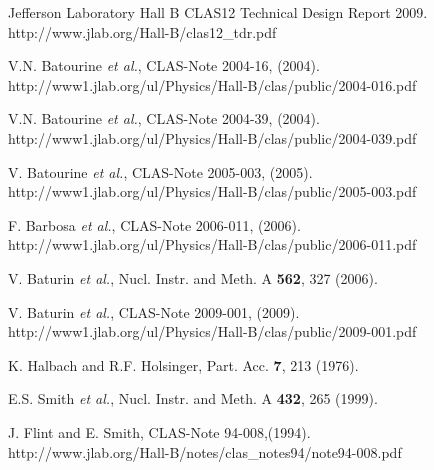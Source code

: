 \documentclass[12pt]{article}
\begin{document}
\begin{thebibliography}{99}

Jefferson Laboratory Hall B CLAS12 Technical Design Report 2009.\\
http://www.jlab.org/Hall-B/clas12\_tdr.pdf

V.N. Batourine {\it et al.}, %
CLAS-Note 2004-16, (2004).\\
http://www1.jlab.org/ul/Physics/Hall-B/clas/public/2004-016.pdf

V.N. Batourine {\it et al.}, %
CLAS-Note 2004-39, (2004).\\
http://www1.jlab.org/ul/Physics/Hall-B/clas/public/2004-039.pdf

V. Batourine {\it et al.}, %
CLAS-Note 2005-003, (2005).\\
http://www1.jlab.org/ul/Physics/Hall-B/clas/public/2005-003.pdf

F. Barbosa {\it et al.}, %
CLAS-Note 2006-011, (2006).\\
http://www1.jlab.org/ul/Physics/Hall-B/clas/public/2006-011.pdf

V. Baturin {\it et al.}, %
Nucl. Instr. and Meth. A {\bf 562}, 327 (2006).

V. Baturin {\it et al.}, %
CLAS-Note 2009-001, (2009).\\
http://www1.jlab.org/ul/Physics/Hall-B/clas/public/2009-001.pdf


K. Halbach and R.F. Holsinger, Part. Acc. {\bf 7}, 213 (1976).

E.S. Smith {\it et al.}, %
Nucl. Instr. and Meth. A {\bf 432}, 265 (1999).


J. Flint and E. Smith, %
CLAS-Note 94-008,(1994).\\
http://www.jlab.org/Hall-B/notes/clas\_notes94/note94-008.pdf


\end{thebibliography}
\end{document}
